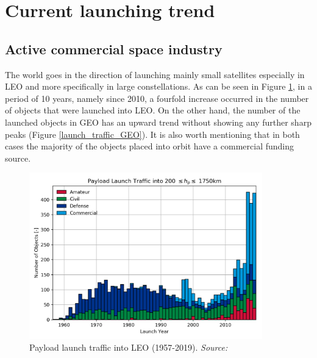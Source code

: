 


\bigskip
\section{Current launching trend}
\bigskip

\subsection{Active commercial space industry}
\bigskip

The world goes in the direction of launching mainly small satellites especially in LEO and more specifically in large constellations. As can be seen in Figure \ref{launch_traffic_LEO}, in a period of 10 years, namely since 2010, a fourfold increase occurred in the number of objects that were launched into LEO. On the other hand, the number of the launched objects in GEO has an upward trend without showing any further sharp peaks (Figure \ref{launch_traffic_GEO}). It is also worth mentioning that in both cases the majority of the objects placed into orbit have a commercial funding source.

\begin{figure}
\centering
\includegraphics[width=0.9\textwidth]{Images/launch_traffic_LEO.png}\caption{Payload launch traffic into LEO (1957-2019). \textit{Source: \cite{ESA 2020}}}
\label{launch_traffic_LEO} 
\end{figure}

